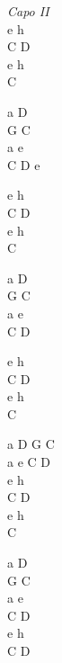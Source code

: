\begin{chord}
    \textit{Capo II}\\
    e h\\
    C D\\
    e h\\
    C

    a D\\
    G C\\
    a e\\
    C D e

    e h\\
    C D\\
    e h\\
    C

    a D\\
    G C\\
    a e\\
    C D

    e h\\
    C D\\
    e h\\
    C

    a D G C\\
    a e C D\\
    e h\\
    C D\\
    e h\\
    C

    a D\\
    G C\\
    a e\\
    C D\\
    e h\\
    C D
\end{chord}